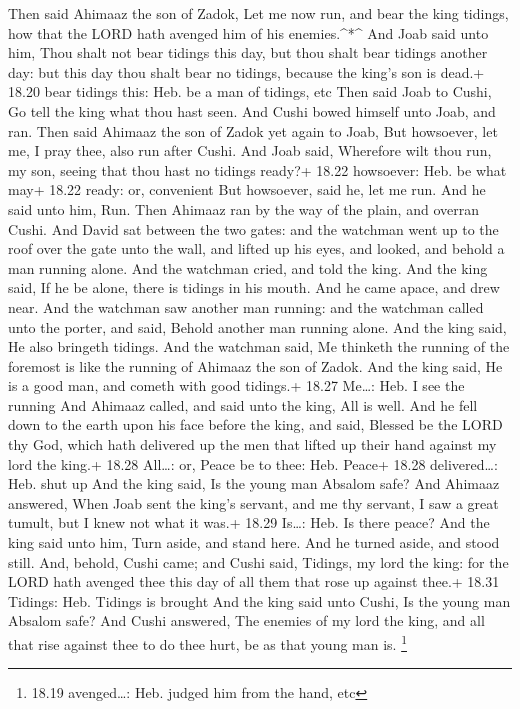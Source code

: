  Then said Ahimaaz the son of Zadok, Let me now run, and
bear the king tidings, how that the LORD hath avenged him of his
enemies.\^{}*\^{}  And Joab said unto him, Thou shalt not
bear tidings this day, but thou shalt bear tidings another day: but this
day thou shalt bear no tidings, because the king's son is dead.+ 18.20
bear tidings this: Heb. be a man of tidings, etc  Then said
Joab to Cushi, Go tell the king what thou hast seen. And Cushi bowed
himself unto Joab, and ran.  Then said Ahimaaz the son of
Zadok yet again to Joab, But howsoever, let me, I pray thee, also run
after Cushi. And Joab said, Wherefore wilt thou run, my son, seeing that
thou hast no tidings ready?+ 18.22 howsoever: Heb. be what may+ 18.22
ready: or, convenient  But howsoever, said he, let me run.
And he said unto him, Run. Then Ahimaaz ran by the way of the plain, and
overran Cushi.  And David sat between the two gates: and
the watchman went up to the roof over the gate unto the wall, and lifted
up his eyes, and looked, and behold a man running alone. 
And the watchman cried, and told the king. And the king said, If he be
alone, there is tidings in his mouth. And he came apace, and drew near.
 And the watchman saw another man running: and the watchman
called unto the porter, and said, Behold another man running alone. And
the king said, He also bringeth tidings.  And the watchman
said, Me thinketh the running of the foremost is like the running of
Ahimaaz the son of Zadok. And the king said, He is a good man, and
cometh with good tidings.+ 18.27 Me\ldots: Heb. I see the running
 And Ahimaaz called, and said unto the king, All is well.
And he fell down to the earth upon his face before the king, and said,
Blessed be the LORD thy God, which hath delivered up the men that lifted
up their hand against my lord the king.+ 18.28 All\ldots: or, Peace be
to thee: Heb. Peace+ 18.28 delivered\ldots: Heb. shut up 
And the king said, Is the young man Absalom safe? And Ahimaaz answered,
When Joab sent the king's servant, and me thy servant, I saw a great
tumult, but I knew not what it was.+ 18.29 Is\ldots: Heb. Is there
peace?  And the king said unto him, Turn aside, and stand
here. And he turned aside, and stood still.  And, behold,
Cushi came; and Cushi said, Tidings, my lord the king: for the LORD hath
avenged thee this day of all them that rose up against thee.+ 18.31
Tidings: Heb. Tidings is brought  And the king said unto
Cushi, Is the young man Absalom safe? And Cushi answered, The enemies of
my lord the king, and all that rise against thee to do thee hurt, be as
that young man is. \footnote{18.19 avenged\ldots: Heb. judged him from
  the hand, etc}

